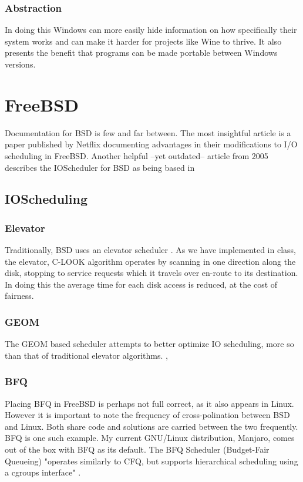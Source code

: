 \documentclass[letterpaper,10pt,notitlepage,fleqn]{article}
\begin{document}
\subsubsection{Abstraction}
In doing this Windows can more easily hide information on how specifically their system works and 
can make it harder for projects like Wine to thrive. It also presents the benefit that programs
can be made portable between Windows versions. 




\section{FreeBSD}

Documentation for BSD is few and far between. The most insightful article is a paper published 
by Netflix \cite{IOBSDCAM}documenting advantages in their modifications to I/O scheduling in 
FreeBSD. Another helpful --yet outdated-- article from 2005 describes the IOScheduler for 
BSD as being based in 

\subsection{IOScheduling}

\subsubsection{Elevator}
Traditionally, BSD uses an elevator scheduler \cite{arrow}. As we have implemented in class,
the elevator, C-LOOK algorithm operates by scanning in one direction along the disk, stopping
to service requests which it travels over en-route to its destination. In doing this the average
time for each disk access is reduced, at the cost of fairness. 

\subsubsection{GEOM}

The GEOM based scheduler attempts to better optimize IO scheduling, more so than that of 
traditional elevator algorithms. 
\cite{GEOM} , \cite{arrow}

\subsubsection{BFQ}
Placing BFQ in FreeBSD is perhaps not full correct, as it also appears in Linux. However it is 
important to note the frequency of cross-polination between BSD and Linux. Both share code 
and solutions are carried between the two frequently. BFQ is one such example. My current
GNU/Linux distribution, Manjaro, comes out of the box with BFQ as its default. The
BFQ Scheduler (Budget-Fair Queueing) "operates similarly to CFQ, but supports hierarchical 
scheduling using a cgroups interface" \cite{BFQ}. 
\end{document}
